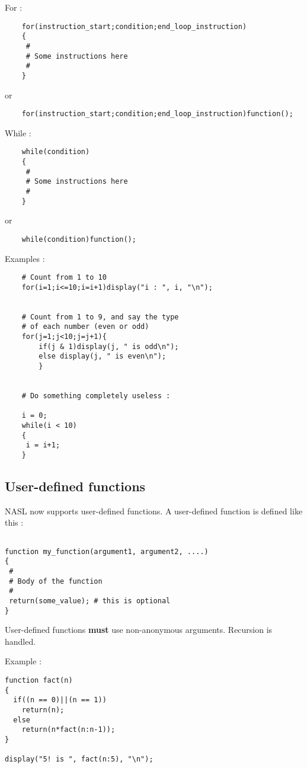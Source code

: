 \documentclass{article}
\begin{document}
For :
\begin{verbatim}
	for(instruction_start;condition;end_loop_instruction)
	{
	 #
	 # Some instructions here 
	 #
	}
\end{verbatim}	
or 
\begin{verbatim}
	for(instruction_start;condition;end_loop_instruction)function();
\end{verbatim}	
	

While :
\begin{verbatim}
	while(condition)
	{
	 #
	 # Some instructions here
	 #	
	}
\end{verbatim}	
or
\begin{verbatim}	
	while(condition)function();
\end{verbatim}	
	
\noindent Examples :

\begin{verbatim}
	# Count from 1 to 10
	for(i=1;i<=10;i=i+1)display("i : ", i, "\n");
	

	# Count from 1 to 9, and say the type
	# of each number (even or odd)
	for(j=1;j<10;j=j+1){
		if(j & 1)display(j, " is odd\n");
		else display(j, " is even\n");		
		}


	# Do something completely useless :
	
	i = 0;
	while(i < 10)
	{
	 i = i+1;
	}

\end{verbatim}


\subsection{User-defined functions}

NASL now supports user-defined functions. A user-defined function is defined
like this :

\begin{verbatim}

function my_function(argument1, argument2, ....)
{
 #
 # Body of the function
 #
 return(some_value); # this is optional
}

\end{verbatim}

User-defined functions \textbf{must} use non-anonymous arguments. Recursion is handled.


Example :
\begin{verbatim}
function fact(n)
{
  if((n == 0)||(n == 1))
    return(n);
  else
    return(n*fact(n:n-1));
}

display("5! is ", fact(n:5), "\n");

\end{verbatim}
\end{document}
